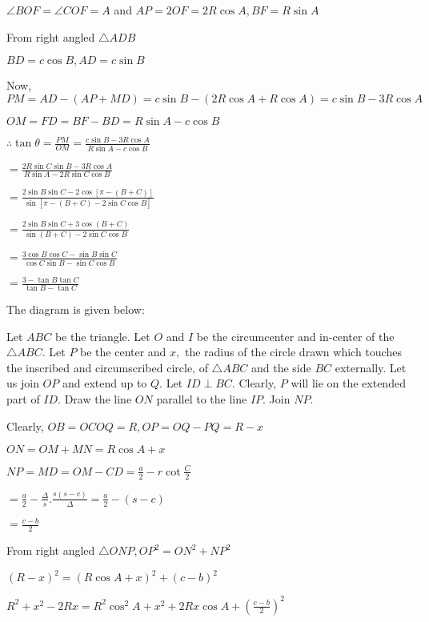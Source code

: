   $\angle BOF = \angle COF = A$ and $AP = 2OF = 2R\cos A, BF = R\sin A$

  From right angled $\triangle ADB$

  $BD = c\cos B, AD = c\sin B$

  Now, $PM = AD - (AP + MD) = c\sin B - (2R\cos A + R\cos A) = c\sin B - 3R\cos A$

  $OM = FD = BF - BD = R\sin A - c\cos B$

  $\therefore \tan\theta = \frac{PM}{OM} = \frac{c\sin B - 3R\cos A}{R\sin A - c\cos B}$

  $= \frac{2R\sin C\sin B - 3R\cos A}{R\sin A - 2R\sin C\cos B}$

  $= \frac{2\sin B\sin C - 2\cos[\pi - (B + C)]}{\sin[\pi - (B + C)- 2\sin C\cos B]}$

  $= \frac{2\sin B\sin C + 3\cos(B + C)}{\sin(B + C) - 2\sin C\cos B}$

  $= \frac{3\cos B\cos C - \sin B\sin C}{\cos C\sin B - \sin C\cos B}$

  $= \frac{3 - \tan B\tan C}{\tan B - \tan C}$

\item The diagram is given below:

  \startplacefigure
    \externalfigure[21_4.pdf]
  \stopplacefigure

  Let $ABC$ be the triangle. Let $O$ and $I$ be the circumcenter and in-center of the $\triangle ABC.$
  Let $P$ be the center and $x,$ the radius of the circle drawn which touches the inscribed and circumscribed
  circle, of $\triangle ABC$ and the side $BC$ externally. Let us join $OP$ and extend up to $Q.$ Let
  $ID\perp BC.$ Clearly, $P$ will lie on the extended part of $ID.$ Draw the line $ON$ parallel to the
  line $IP.$ Join $NP.$

  Clearly, $OB = OC OQ = R, OP = OQ - PQ = R - x$

  $ON = OM + MN = R\cos A + x$

  $NP = MD = OM - CD = \frac{a}{2} - r\cot \frac{C}{2}$

  $= \frac{a}{2} - \frac{\Delta}{s}.\frac{s(s - c)}{\Delta} = \frac{a}{2} - (s - c)$

  $= \frac{c - b}{2}$

  From right angled $\triangle ONP, OP^2 = ON^2 + NP^2$

  $(R - x)^2 = (R\cos A + x)^2 + \left(c - b\right)^2$

  $R^2 + x^2 - 2Rx = R^2\cos^2A + x^2 + 2Rx\cos A + \left(\frac{c - b}{2}\right)^2$

